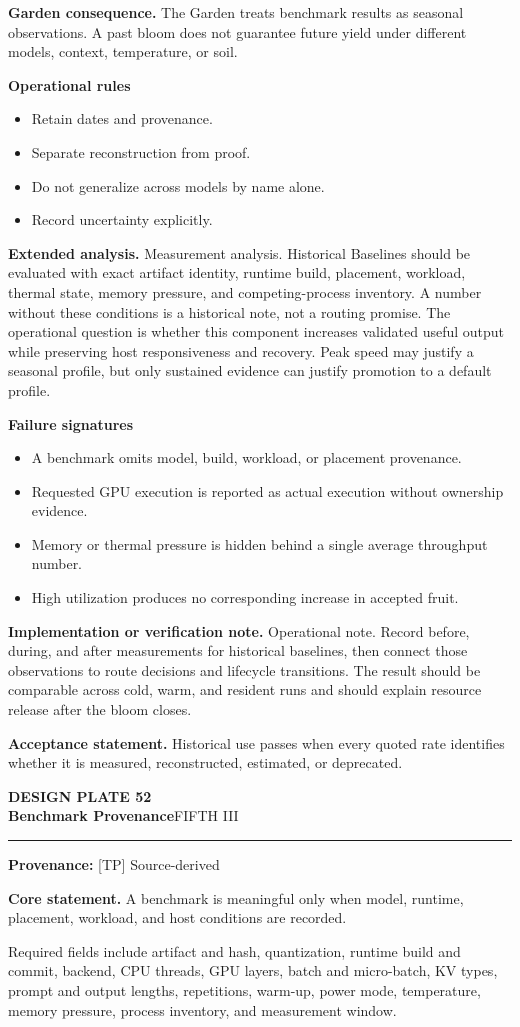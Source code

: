 \documentclass[10pt,letterpaper,oneside]{article}
\newcommand{\prov}[1]{\textcolor{gardenBlue}{\sffamily\footnotesize\textbf{Provenance:} #1}}
\newcommand{\platetitle}[3]{%
  \begin{minipage}[t][0.54in][t]{\textwidth}
  {\sffamily\bfseries\color{gardenDeep}\fontsize{9}{10}\selectfont DESIGN PLATE #1}\\[-1pt]
  {\sffamily\bfseries\color{gardenInk}\fontsize{16.5}{18}\selectfont #2}\hfill{\sffamily\color{gardenGreen}\large #3}
  \end{minipage}\vspace{-2pt}\hrule\vspace{5pt}}
\begin{document}
\textbf{Garden consequence.} The Garden treats benchmark results as seasonal observations. A past bloom does not guarantee future yield under different models, context, temperature, or soil.

\textbf{Operational rules}
\begin{itemize}
\item Retain dates and provenance.
\item Separate reconstruction from proof.
\item Do not generalize across models by name alone.
\item Record uncertainty explicitly.
\end{itemize}
\textbf{Extended analysis.} Measurement analysis. Historical Baselines should be evaluated with exact artifact identity, runtime build, placement, workload, thermal state, memory pressure, and competing-process inventory. A number without these conditions is a historical note, not a routing promise. The operational question is whether this component increases validated useful output while preserving host responsiveness and recovery. Peak speed may justify a seasonal profile, but only sustained evidence can justify promotion to a default profile.

\textbf{Failure signatures}
\begin{itemize}
\item A benchmark omits model, build, workload, or placement provenance.
\item Requested GPU execution is reported as actual execution without ownership evidence.
\item Memory or thermal pressure is hidden behind a single average throughput number.
\item High utilization produces no corresponding increase in accepted fruit.
\end{itemize}
\textbf{Implementation or verification note.} Operational note. Record before, during, and after measurements for historical baselines, then connect those observations to route decisions and lifecycle transitions. The result should be comparable across cold, warm, and resident runs and should explain resource release after the bloom closes.

\begin{acceptbox}
\textbf{Acceptance statement.} Historical use passes when every quoted rate identifies whether it is measured, reconstructed, estimated, or deprecated.
\end{acceptbox}
\newpage
\platetitle{52}{Benchmark Provenance}{FIFTH III}
\prov{[TP] Source-derived}
\fontsize{8.85}{10.45}\selectfont
\begin{corebox}
\textbf{Core statement.} A benchmark is meaningful only when model, runtime, placement, workload, and host conditions are recorded.
\end{corebox}
Required fields include artifact and hash, quantization, runtime build and commit, backend, CPU threads, GPU layers, batch and micro-batch, KV types, prompt and output lengths, repetitions, warm-up, power mode, temperature, memory pressure, process inventory, and measurement window.
\end{document}
